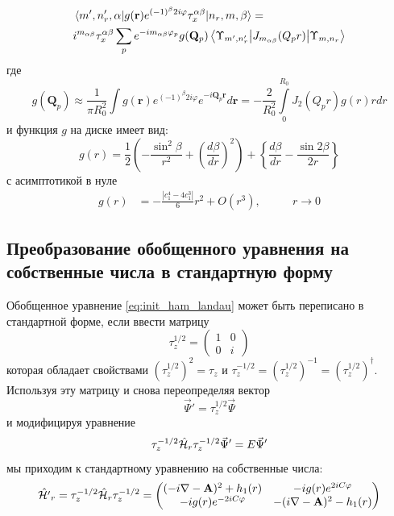 \documentclass[a4paper,article,14pt]{extarticle}
\begin{document}
\begin{equation}
\label{eq:final_g}
\begin{aligned}
&\mel{m', n'_r, \alpha} {g(\mathbf{r})   e^{ (-1)^{\beta} 2  i   \varphi} \tau^{\alpha \beta}_x} {n_r,m,\beta} = \\ 
&i^{m_{\alpha \beta}} \tau^{\alpha \beta}_x \sum\limits_{p}      e^{-i m_{\alpha \beta} \varphi_p}  g(\mathbf{Q}_p)\mel{\Upsilon_{m', n'_r}} {J_{m_{\alpha \beta}} ( Q_p r) }{\Upsilon_{m, n_r}}
\end{aligned}
\end{equation}
\noindent где 
\begin{equation}
\label{eq:fourier_g}
g (\mathbf{Q}_p) \approx \frac{1}{\pi R_0^2}  \int  g(\mathbf{r})   e^{ (-1)^{\beta} 2  i   \varphi} e^{-i \mathbf{Q}_p \mathbf{r}}  d\mathbf{r} = - \frac{2}{R_0^2}  \int\limits_{0}^{R_0}  J_2 (Q_p r ) g(r) r dr 
\end{equation} 
и функция $g$ на диске имеет вид:
\begin{equation}
g(r) = \frac{1}{2}\left(  - \frac{\sin ^2\beta }{r^2} + \left( \frac{d\beta }{dr} \right)^2 \right) 
+ \left\{ \frac{d\beta }{dr} - \frac{\sin 2\beta }{2r} \right\}
\end{equation}
с асимптотикой в нуле
\begin{equation}
\begin{aligned}
g(r) &= -\frac{\left|c_1^4-4 
   c_1^3\right|}{6} r^2  +O\left(r^3\right), \qquad &r \rightarrow 0
\end{aligned}
\end{equation}



\subsection{Преобразование обобщенного уравнения на собственные числа в стандартную форму}


Обобщенное уравнение \eqref{eq:init_ham_landau} может быть переписано в стандартной форме, если ввести матрицу
$$
\tau_z^{1/2} = 
	\begin{pmatrix} 	
		1 &  0 \\
		0 &  i 
	\end{pmatrix}
$$
которая обладает свойствами $(\tau_z^{1/2})^2 = \tau_z$ и $\tau_z^{-1/2}=(\tau_z^{1/2})^{-1}=(\tau_z^{1/2})^\dagger$.
Используя эту матрицу и снова переопределяя вектор 
$$
\vec{\Psi}'=\tau_z^{1/2} \vec{\Psi}
$$
и модифицируя уравнение
$$
\tau_z^{-1/2} \hat {\cal H}_{r} \tau_z^{-1/2} \vec{\Psi}' = E \vec{\Psi}'
$$
мы приходим к стандартному уравнению на собственные числа:
\begin{equation}
\label{eq:std_form_eigen}
\hat {\cal H'}_{r} = \tau_z^{-1/2} \hat {\cal H}_{r} \tau_z^{-1/2} = \begin{pmatrix} 
(- i \nabla - \mathbf{A} ) ^ 2 + h_1 (r) &  -i g (r) e^{2 i C \varphi} \\  
-i g (r) e^{-2 i C \varphi}   & - ( i \nabla - \mathbf{A} ) ^ 2 - h_1 (r) 
\end{pmatrix}
\end{equation}
\end{document}
